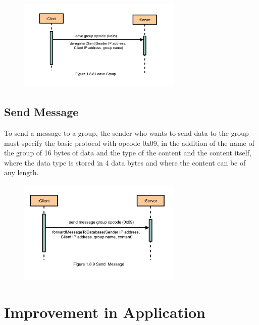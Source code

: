 				\begin{figure}
					\centering
							\includegraphics[width=0.7\textwidth]{gfx/1.8.8_Leave_Group}
					\label{fig:leave-group}
				\end{figure}

    \subsection{Send Message}\label{subsec:send}
	To send a message to a group, the sender who wants to send data to the group must specify
    the basic protocol  with opcode 0x09, in the addition of the name of the group of 16 bytes
    of data and the type of the content and the content itself, where the data type is stored
    in 4 data bytes and where the content can be of any length.
    
		    \begin{figure}
		    	\centering
		    		\includegraphics[width=0.7\textwidth]{gfx/1.8.9_Send_Message}
		    	\label{fig:send-message}
		    \end{figure}
    \medskip

    \noindent


    \section{Improvement in Application}\label{sec:improvement in application}

